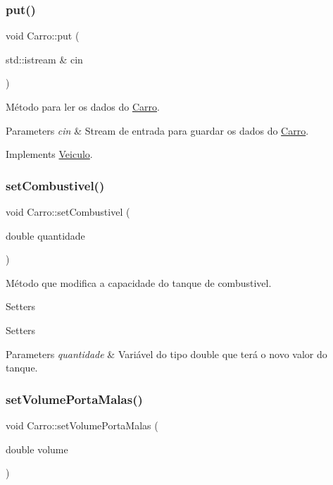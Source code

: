\subsubsection{\texorpdfstring{put()}{put()}}
{\footnotesize\ttfamily void Carro\+::put (\begin{DoxyParamCaption}\item[{std\+::istream \&}]{cin }\end{DoxyParamCaption})\hspace{0.3cm}{\ttfamily [virtual]}}



Método para ler os dados do \hyperlink{classCarro}{Carro}. 


\begin{DoxyParams}{Parameters}
{\em cin} & Stream de entrada para guardar os dados do \hyperlink{classCarro}{Carro}. \\
\hline
\end{DoxyParams}


Implements \hyperlink{classVeiculo}{Veiculo}.

\mbox{\label{classCarro_a826a4c03c3bf115d0b71bd5504c32a24}} 
\subsubsection{\texorpdfstring{set\+Combustivel()}{setCombustivel()}}
{\footnotesize\ttfamily void Carro\+::set\+Combustivel (\begin{DoxyParamCaption}\item[{double}]{quantidade }\end{DoxyParamCaption})}



Método que modifica a capacidade do tanque de combustivel. 

Setters

Setters 
\begin{DoxyParams}{Parameters}
{\em quantidade} & Variável do tipo double que terá o novo valor do tanque. \\
\hline
\end{DoxyParams}
\mbox{\label{classCarro_ae4624938c5f8f48fc313b3a0a3b6fa48}} 
\subsubsection{\texorpdfstring{set\+Volume\+Porta\+Malas()}{setVolumePortaMalas()}}
{\footnotesize\ttfamily void Carro\+::set\+Volume\+Porta\+Malas (\begin{DoxyParamCaption}\item[{double}]{volume }\end{DoxyParamCaption})}



